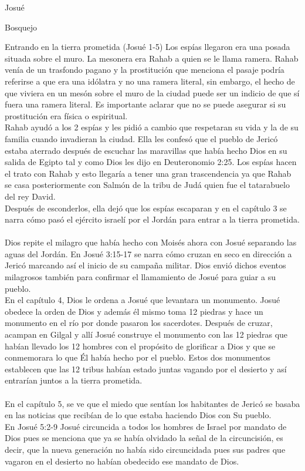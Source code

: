 \begin{section}{Josué}
\begin{subsection}{Bosquejo}
\begin{subsubsection}{Entrando en la tierra prometida (Josué 1-5)}
Los espías llegaron era una posada situada sobre el muro. La mesonera era Rahab a quien se le llama ramera. Rahab venía de un trasfondo pagano y la prostitución que menciona el pasaje podría referirse a que era una idólatra y no una ramera literal, sin embargo, el hecho de que viviera en un mesón sobre el muro de la ciudad puede ser un indicio de que sí fuera una ramera literal. Es importante aclarar que no se puede asegurar si su prostitución era física o espiritual.\\
Rahab ayudó a los 2 espías y les pidió a cambio que respetaran su vida y la de su familia cuando invadieran la ciudad. Ella les confesó que el pueblo de Jericó estaba aterrado después de escuchar las maravillas que había hecho Dios en su salida de Egipto tal y como Dios les dijo en Deuteronomio 2:25.
\newpage
Los espías hacen el trato con Rahab y esto llegaría a tener una gran trascendencia ya que Rahab se casa posteriormente con Salmón de la tribu de Judá quien fue el tatarabuelo del rey David.\\
Después de esconderlos, ella dejó que los espías escaparan y en el capítulo 3 se narra cómo pasó el ejército israelí por el Jordán para entrar  a la tierra prometida.\\\\
Dios repite el milagro que había hecho con Moisés ahora con Josué separando las aguas del Jordán. En Josué 3:15-17 se narra cómo cruzan en seco en dirección a Jericó marcando así el inicio de su campaña militar. Dios envió dichos eventos milagrosos también para confirmar el llamamiento de Josué para guiar a su pueblo.\\
En el capítulo 4, Dios le ordena a Josué que levantara un monumento. Josué obedece la orden de Dios y además él mismo toma 12 piedras y hace un monumento en el río por donde pasaron los sacerdotes. Después de cruzar, acampan en Gilgal y allí Josué construye el monumento con las 12 piedras que habían llevado los 12 hombres con el propósito de glorificar a Dios y que se conmemorara lo que Él había hecho por el pueblo. Estos dos monumentos establecen que las 12 tribus habían estado juntas vagando por el desierto y así entrarían juntos a la tierra prometida.\\\\
En el capítulo 5, se ve que el miedo que sentían los habitantes de Jericó se basaba en las noticias que recibían de lo que estaba haciendo Dios con Su pueblo.\\
En Josué 5:2-9 Josué circuncida a todos los hombres de Israel por mandato de Dios pues se menciona que ya se había olvidado la señal de la circuncisión, es decir, que la nueva generación no había sido circuncidada pues sus padres que vagaron en el desierto no habían obedecido ese mandato de Dios.\\

\end{subsubsection}
\end{subsection}
\end{section}
